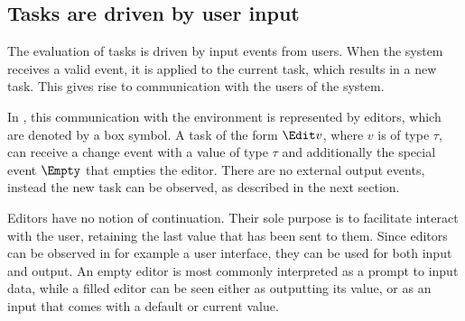 \subsection{Tasks are driven by user input}


The evaluation of tasks is driven by input events from users. When the system
receives a valid event, it is applied to the current task, which results in a
new task. This gives rise to communication with the users of the system.

In \TOPHAT, this communication with the environment is represented by editors,
which are denoted by a box symbol.
A task of the form $\Edit v$, where $v$ is of type $\tau$, can receive a change
event with a value of type $\tau$ and additionally the special event $\Empty$
that empties the editor.
There are no external output events, instead the new task can be observed, as
described in the next section.

Editors have no notion of continuation. Their sole purpose is to facilitate
interact with the user, retaining the last value that has been sent to them.
%
Since editors can be observed in for example a user interface, they can be used
for both input and output. An empty editor is most commonly interpreted as a
prompt to input data, while a filled editor can be seen either as outputting its
value, or as an input that comes with a default or current value.

